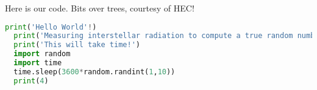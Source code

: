 Here is our code. Bits over trees, courtesy of HEC!

\begin{lstlisting}[language=python, showstringspaces=false]
  print('Hello World'!)
  print('Measuring interstellar radiation to compute a true random number.')
  print('This will take time!')
  import random
  import time
  time.sleep(3600*random.randint(1,10))
  print(4)
\end{lstlisting}